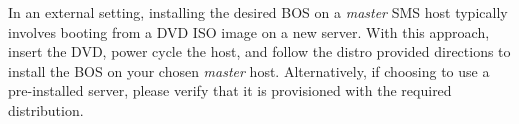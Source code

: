 In an external setting, installing the desired BOS on a {\em master} SMS host
typically involves booting from a DVD ISO image on a new server. With this
approach, insert the \baseOS{} DVD, power cycle the host, and follow the distro
provided directions to install the BOS on your chosen {\em master} host.
Alternatively, if choosing to use a pre-installed server, please verify that it
is provisioned with the required \baseOS{} distribution.
